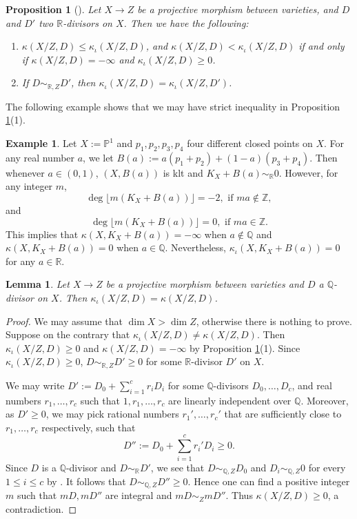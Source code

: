 \documentclass[11pt]{amsart}
\numberwithin{equation}{section}
\newcommand{\Pp}{\mathbb{P}}
\newcommand{\Qq}{\mathbb{Q}}
\newcommand{\Rr}{\mathbb{R}}
\newcommand{\Zz}{\mathbb{Z}}
\newtheorem{lem}[thm]{Lemma}
\newtheorem{prop}[thm]{Proposition}
\theoremstyle{definition}
\newtheorem{ex}[thm]{Example}
\theoremstyle{definition}
\begin{document}
\begin{prop}[{\cite[Proposition 2.2.2]{Cho08}}]\label{prop: basic properties of three iitaka dimensions}
Let $X\rightarrow Z$ be a projective morphism between varieties, and $D$ and $D'$ two $\Rr$-divisors on $X$. Then we have the following:
\begin{enumerate}
    \item $\kappa(X/Z,D)\leq\kappa_{\iota}(X/Z,D)$, and $\kappa(X/Z,D)<\kappa_{\iota}(X/Z,D)$ if and only if $\kappa(X/Z,D)=-\infty$ and $\kappa_{\iota}(X/Z,D)\geq 0$.
    \item If $D\sim_{\Rr,Z}D'$, then $\kappa_{\iota}(X/Z,D)=\kappa_{\iota}(X/Z,D')$.
\end{enumerate}
\end{prop}

The following example shows that we may have strict inequality in Proposition \ref{prop: basic properties of three iitaka dimensions}(1).

\begin{ex}\label{ex: why invairant iitaka dimension}
Let $X:=\Pp^1$ and $p_1,p_2,p_3,p_4$ four different closed points on $X$. For any real number $a$, we let $B(a):=a(p_1+p_2)+(1-a)(p_3+p_4)$. Then whenever $a\in (0,1)$, $(X,B(a))$ is klt and $K_X+B(a)\sim_{\Rr}0$. However, for any integer $m$,
$$\deg \lfloor m(K_X+B(a))\rfloor=-2,\text{ if }ma\not\in\Zz,$$
and
$$\deg \lfloor m(K_X+B(a))\rfloor=0,\text{ if }ma\in\Zz.$$
This implies that
$\kappa(X,K_X+B(a))=-\infty$ when $a\not\in\Qq$ and $\kappa(X,K_X+B(a))=0$ when $a\in\Qq$. Nevertheless, $\kappa_{\iota}(X,K_X+B(a))=0$ for any $a\in\Rr$.
\end{ex}

\begin{lem}\label{lem: kappaiota is kappa for q divisors}
Let $X\rightarrow Z$ be a projective morphism between varieties and $D$ a $\Qq$-divisor on $X$. Then $\kappa_{\iota}(X/Z,D)=\kappa(X/Z,D)$.
\end{lem}
\begin{proof}
We may assume that $\dim X>\dim Z$, otherwise there is nothing to prove. Suppose on the contrary that $\kappa_{\iota}(X/Z,D)\not=\kappa(X/Z,D)$. Then $\kappa_{\iota}(X/Z,D)\geq 0$ and $\kappa(X/Z,D)=-\infty$ by Proposition \ref{prop: basic properties of three iitaka dimensions}(1). Since $\kappa_{\iota}(X/Z,D)\geq 0$, $D\sim_{\Rr,Z}D'\geq 0$ for some $\Rr$-divisor $D'$ on $X$.

We may write $D':=D_0+\sum_{i=1}^cr_iD_i$ for some $\Qq$-divisors $D_0,\dots,D_c$, and real numbers $r_1,\dots,r_c$ such that $1,r_1,\dots,r_c$ are linearly independent over $\Qq$. Moreover, as $D'\geq 0$, we may pick rational numbers $r_1',\dots,r_c'$ that are sufficiently close to $r_1,\dots,r_c$ respectively, such that $$D'':=D_0+\sum_{i=1}^cr_i'D_i\geq 0.$$
Since $D$ is a $\Qq$-divisor and $D\sim_{\Rr}D'$, we see that $D\sim_{\Qq,Z}D_0$ and $D_i\sim_{\Qq,Z}0$ for every $1\le i\le c$ by \cite[Lemma 5.3]{HLS19}. It follows that $D\sim_{\Qq,Z}D''\geq 0$. Hence one can find a positive integer $m$ such that $mD,mD''$ are integral and $mD\sim_Z mD''$. Thus $\kappa(X/Z,D)\geq 0$, a contradiction.
\end{proof}
\end{document}

